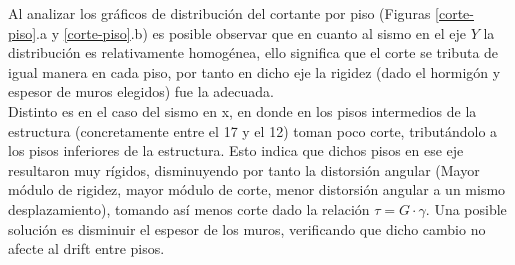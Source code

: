 Al analizar los gráficos de distribución del cortante por piso (Figuras \ref{corte-piso}.a y \ref{corte-piso}.b) es posible observar que en cuanto al sismo en el eje $Y$ la distribución es relativamente homogénea, ello significa que el corte se tributa de igual manera en cada piso, por tanto en dicho eje la rigidez (dado el hormigón y espesor de muros elegidos) fue la adecuada. \\

Distinto es en el caso del sismo en x, en donde en los pisos intermedios de la estructura (concretamente entre el 17 y el 12) toman poco corte, tributándolo a los pisos inferiores de la estructura. Esto indica que dichos pisos en ese eje resultaron muy rígidos, disminuyendo por tanto la distorsión angular (Mayor módulo de rigidez, mayor módulo de corte, menor distorsión angular a un mismo desplazamiento), tomando así menos corte dado la relación $\tau = G \cdot \gamma$. Una posible solución es disminuir el espesor de los muros, verificando que dicho cambio no afecte al drift entre pisos.
